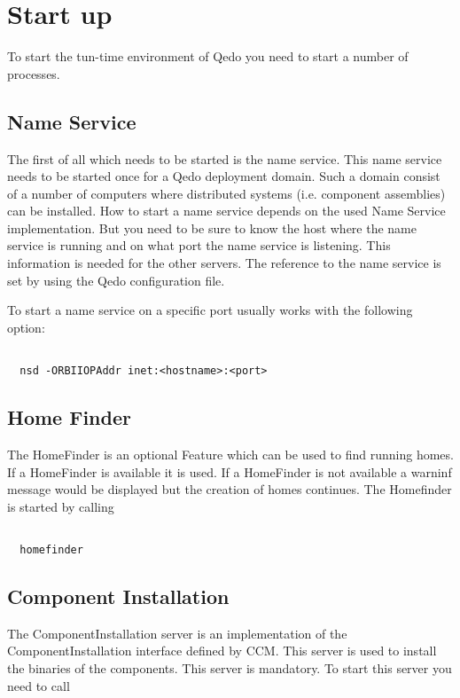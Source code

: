 \documentclass[12pt,a4paper]{report}
\begin{document}
\section{Start up}
\label{sec:StartUp}
To start the tun-time environment of Qedo you need to start a number of processes. 

\subsection{Name Service}
\label{sec:NameService}

The first of all which needs to be started is the name service. This name service needs to be started once for a Qedo deployment domain. Such a domain consist of a number of computers where distributed systems (i.e. component assemblies) can be installed. How to start a name service depends on the used Name Service implementation. But you need to be sure to know the host where the name service is running and on what port the name service is listening. This information is needed for the other servers. The reference to the name service is set by using the Qedo configuration file. 

To start a name service on a specific port usually works with the following option:

\small
\begin{verbatim}

  nsd -ORBIIOPAddr inet:<hostname>:<port>

\end{verbatim}
\normalsize

\subsection{Home Finder}
\label{sec:HomeFinder}

The HomeFinder is an optional Feature which can be used to find running homes. If a HomeFinder is available it is used. If a HomeFinder is not available a warninf message would be displayed but the creation of homes continues. The Homefinder is started by calling

\small
\begin{verbatim}

  homefinder

\end{verbatim}
\normalsize

\subsection{Component Installation}
\label{sec:ComponentInstallation}
The ComponentInstallation server is an implementation of the ComponentInstallation interface defined by CCM. This server is used to install the binaries of the components. This server is mandatory. To start this server you need to call
\end{document}
